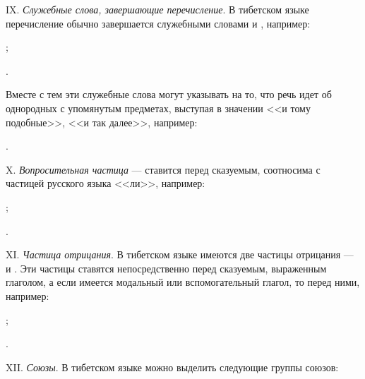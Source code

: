 IX.	\emph{Служебные слова, завершающие перечисление}. В тибетском языке перечисление обычно завершается служебными словами  и , например:
\begin{prfsample}
	\item {};
	\item {}.
\end{prfsample}
Вместе с тем эти служебные слова могут указывать на то, что речь идет об однородных с упомянутым предметах, выступая в значении <<и тому подобные>>, <<и так далее>>, например:
\begin{prfsample}
	\item {}.
\end{prfsample}

X. \emph{Вопросительная частица}  --- ставится перед сказуемым, соотносима с частицей русского языка <<ли>>, например:
\begin{prfsample}
	\item {};
	\item {}.
\end{prfsample}

XI. \emph{Частица отрицания}. В тибетском языке имеются две частицы отрицания ---  и . Эти частицы ставятся непосредственно перед сказуемым, выраженным глаголом, а если имеется модальный или вспомогательный глагол, то перед ними, например:
\begin{prfsample}
	\item {};
	\item {}.
\end{prfsample}

XII. \emph{Союзы}. В тибетском языке можно выделить следующие группы союзов:

